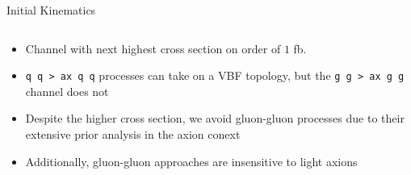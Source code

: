 \documentclass[]{beamer}
\begin{document}
\begin{frame}{Initial Kinematics}
\begin{columns}
\begin{column}{0.5\linewidth}
\begin{block}
\begin{itemize}
                    \item Channel with next highest cross section on order of $1$ fb.
                    \item \texttt{q q > ax q q} processes can take on a VBF topology, but the \texttt{g g > ax g g} channel does not
                    \item Despite the higher cross section, we avoid gluon-gluon processes due to their extensive prior analysis in the axion conext
                    \item Additionally, gluon-gluon approaches are insensitive to light axions
                \end{itemize}
            \end{block}
        \end{column}
    \end{columns}
\end{frame}
\end{document}

